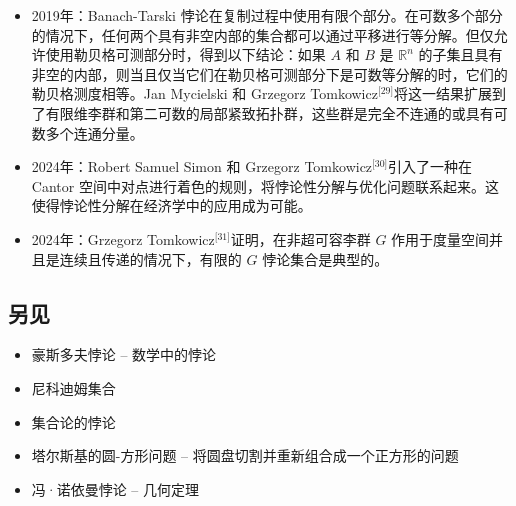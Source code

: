 \begin{itemize}
\item 2019年：Banach-Tarski 悖论在复制过程中使用有限个部分。在可数多个部分的情况下，任何两个具有非空内部的集合都可以通过平移进行等分解。但仅允许使用勒贝格可测部分时，得到以下结论：如果 \( A \) 和 \( B \) 是 \( \mathbb{R}^n \) 的子集且具有非空的内部，则当且仅当它们在勒贝格可测部分下是可数等分解的时，它们的勒贝格测度相等。Jan Mycielski 和 Grzegorz Tomkowicz\(^\text{[29]}\)将这一结果扩展到了有限维李群和第二可数的局部紧致拓扑群，这些群是完全不连通的或具有可数多个连通分量。
\item 2024年：Robert Samuel Simon 和 Grzegorz Tomkowicz\(^\text{[30]}\)引入了一种在 Cantor 空间中对点进行着色的规则，将悖论性分解与优化问题联系起来。这使得悖论性分解在经济学中的应用成为可能。
\item 2024年：Grzegorz Tomkowicz\(^\text{[31]}\)证明，在非超可容李群 \( G \) 作用于度量空间并且是连续且传递的情况下，有限的 \( G \) 悖论集合是典型的。
\end{itemize}
\subsection{另见}  
\begin{itemize}
\item 豪斯多夫悖论 – 数学中的悖论  
\item 尼科迪姆集合  
\item 集合论的悖论  
\item 塔尔斯基的圆-方形问题 – 将圆盘切割并重新组合成一个正方形的问题  
\item 冯·诺依曼悖论 – 几何定理
\end{itemize}
